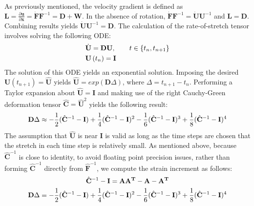 As previously mentioned, the velocity gradient is defined as $\mathbf{L} = \frac{\partial \mathbf{u}}{\partial \mathbf{x}} = \dot{\mathbf{F}}\mathbf{F}^{-1} = \bm{D} + \bm{W}$. In the absence of rotation, $\dot{\mathbf{F}}\mathbf{F}^{-1} = \dot{\mathbf{U}}\mathbf{U}^{-1}$ and $\mathbf{L} = \mathbf{D}$. Combining results yields $\dot{\mathbf{U}}\mathbf{U}^{-1} = \mathbf{D}$. The calculation of the rate-of-stretch tensor involves solving the following ODE:
\begin{align}
&\dot{{\bf U}} = {\bf D}{\bf U}, \qquad t\in\{t_n, t_{n+1}\} \\
&{\bf U}\left(t_n\right) = \bf{I}
\end{align}
The solution of this ODE yields an exponential solution. Imposing the desired ${\mathbf{U}}\left(t_{n+1}\right) = \hat{\mathbf{U}}$ yields $\hat{\mathbf{U}} = exp\left(\mathbf{D}\Delta\right)$, where $\Delta = t_{n+1} - t_{n}$. Performing a Taylor expansion about $\mathbf{\hat{U}} = \mathbf{I}$ and making use of the right Cauchy-Green deformation tensor $\hat{\mathbf{C}} = \hat{\mathbf{U}}^2$ yields the following result: 
\begin{equation}
{\bf D}\Delta \approx -\frac{1}{2}(\hat{\bf C}^{-1} - {\bf I})+ \frac{1}{4} (\hat{\bf C}^{-1} - {\bf I})^{2} - \frac{1}{6} (\hat{\bf C}^{-1} - {\bf I})^{3} + \frac{1}{8}(\hat{\bf C}^{-1} - {\bf I})^{4}
\end{equation}
The assumption that $\mathbf{\hat{U}}$ is near $\mathbf{I}$ is valid as long as the time steps are chosen that the stretch in each time step is relatively small. As mentioned above, because $\hat{\mathbf{C}}^{-1}$ is close to identity, to avoid floating point precision issues, rather than forming $\hat{\mathbf{C}}^{-1}$ directly from $\hat{\mathbf{F}}^{-1}$, we compute the strain increment as follows:
\begin{gather}
\hat{\bf C}^{-1} - {\bf I} = \bf A A^T - A - A^T \\
{\bf D}\Delta = -\frac{1}{2}(\hat{\bf C}^{-1} - {\bf I})+ \frac{1}{4} (\hat{\bf C}^{-1} - {\bf I})^{2} - \frac{1}{6} (\hat{\bf C}^{-1} - {\bf I})^{3} + \frac{1}{8}(\hat{\bf C}^{-1} - {\bf I})^{4}
\end{gather}

